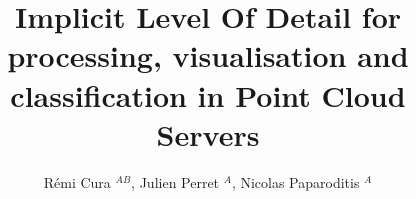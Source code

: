 
	
 
\title{ Implicit Level Of Detail for processing, visualisation and classification in Point Cloud Servers}

\author{Rémi Cura  $^{AB}$, Julien Perret $^A$, Nicolas Paparoditis  $^A$}
\address{ $^A$  Universite Paris-Est, IGN, SRIG, COGIT \& MATIS, 73 avenue de Paris, 94160 Saint Mande, France\\
	first\_name.last\_name@ign.fr
	\\$^B$  Thales Training \& Simulation SAS, 1 rue du Général de Gaulle 95523 Cergy-Pontoise, France}






\maketitle 
	

